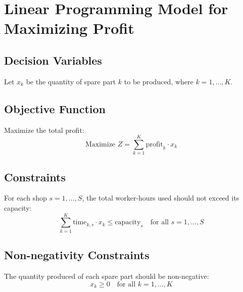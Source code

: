 \documentclass{article}
\begin{document}
\section*{Linear Programming Model for Maximizing Profit}

\subsection*{Decision Variables}
Let \( x_k \) be the quantity of spare part \( k \) to be produced, where \( k = 1, \ldots, K \).

\subsection*{Objective Function}
Maximize the total profit:
\[
\text{Maximize } Z = \sum_{k=1}^{K} \text{profit}_k \cdot x_k
\]

\subsection*{Constraints}
For each shop \( s = 1, \ldots, S \), the total worker-hours used should not exceed its capacity:
\[
\sum_{k=1}^{K} \text{time}_{k, s} \cdot x_k \leq \text{capacity}_s \quad \text{for all } s = 1, \ldots, S
\]

\subsection*{Non-negativity Constraints}
The quantity produced of each spare part should be non-negative:
\[
x_k \geq 0 \quad \text{for all } k = 1, \ldots, K
\]
\end{document}
